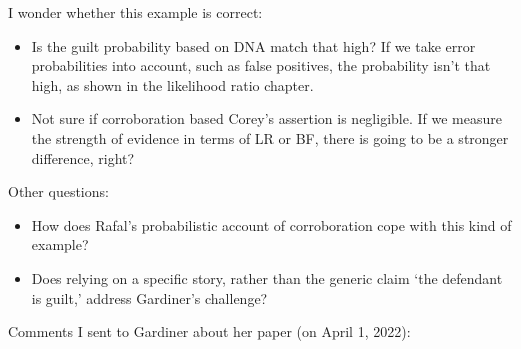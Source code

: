 \documentclass[
  11pt,
  dvipsnames,enabledeprecatedfontcommands]{scrartcl}
\begin{document}
I wonder whether this example is correct:

\begin{itemize}
\item
  Is the guilt probability based on DNA match that high? If we take
  error probabilities into account, such as false positives, the
  probability isn't that high, as shown in the likelihood ratio chapter.
\item
  Not sure if corroboration based Corey's assertion is negligible. If we
  measure the strength of evidence in terms of LR or BF, there is going
  to be a stronger difference, right?
\end{itemize}

Other questions:

\begin{itemize}
\item
  How does Rafal's probabilistic account of corroboration cope with this
  kind of example?
\item
  Does relying on a specific story, rather than the generic claim `the
  defendant is guilt,' address Gardiner's challenge?
\end{itemize}

Comments I sent to Gardiner about her paper (on April 1, 2022):
\end{document}
